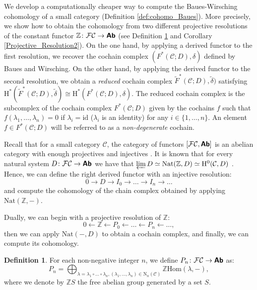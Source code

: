 \documentclass[12pt,reqno]{amsart}
\theoremstyle{definition}
\newtheorem{defi}[teo]{Definition}
\theoremstyle{remark}
\numberwithin{figure}{section}%
\newcommand{\CC}{\mathcal{C}}
\newcommand{\Ho}{\mathrm{H}}
\newcommand{\F}{\mathcal{F}}
\newcommand{\id}{\mathrm{id}}
\newcommand{\N}{\mathrm{N}}
\newcommand{\Ab}{\textbf{\textsf{Ab}}}
\begin{document}
We develop a computationally cheaper way to compute the Baues-Wirsching cohomology of a small category (Definition \ref{def:cohomo_Baues}). More precisely, we  show how to obtain the cohomology from two different projective resolutions of the constant functor $\mathbb{Z}\colon \F \CC \rightarrow \Ab$ (see Definition \ref{Projective_Resolution1} and Corollary \ref{Projective_Resolution2}). On the one hand, by applying a derived functor to the first resolution, we recover the cochain complex $(F^*(\CC;D),\delta)$ defined by Baues and Wirsching. On the other hand, by applying the derived functor to the second resolution, we obtain a \textit{reduced} cochain complex $\tilde{F}^*(\CC;D),\tilde{\delta})$ satisfying $\Ho^*(\tilde{F}^*(\CC;D),\tilde{\delta})\cong \Ho^*(F^*(\CC;D),\delta)$.  The reduced cochain complex is the subcomplex of the cochain complex $F^*(\CC;D)$ given by the cochains $f$ such that $f(\lambda_1,\dots,\lambda_n)=0$ if $\lambda_i=\id$ ($\lambda_i$ is an identity) for any $i\in \{1,\ldots,n\}$. An element $f\in F^*(\CC;D)$ will be referred to as a \textit{non-degenerate} cochain. 

Recall that for  a small category $\CC$, the category of functors $[\F \CC,\Ab]$ is an abelian category with enough projectives and injectives \cite[Section 1.1]{Cegarra}. It is known that for every natural system $D\colon \F \CC \rightarrow \Ab$ we have that $\varprojlim D \simeq \mathrm{Nat}(\mathbb{Z},D)\simeq \Ho^0(\CC,D)$ \cite[Section 1.2]{Cegarra}. Hence, we can define the right derived functor with an injective resolution: $$0 \rightarrow D \rightarrow I_0 \rightarrow \dots \rightarrow I_n \rightarrow \dots $$
and compute the cohomology of the chain complex obtained by applying $\mathrm{Nat(\mathbb{Z},-)}.$ 

Dually, we can begin with a projective resolution of $\mathbb{Z}$: 
$$0 \leftarrow \mathbb{Z} \leftarrow P_0 \leftarrow \dots \leftarrow P_n \leftarrow \dots,$$
then we can apply $\mathrm{Nat}(-,D)$ to obtain a cochain complex, and finally, we can compute its cohomology.

 


\begin{defi}\label{Projective_Resolution1}
    For each non-negative integer $n$, we define $P_n\colon \F\CC \to \Ab$ as:
    $$P_n=\bigoplus_{\lambda=\lambda_1\circ \dots \circ \lambda_n,(\lambda_1, \dots, \lambda_n) \in\N_n(\CC) } \mathbb{Z}  \mathrm{Hom}(\lambda,-),$$
    where we denote by $ \mathbb{Z} S$ the free abelian group generated by a set $S$. 
\end{defi}
\end{document}

